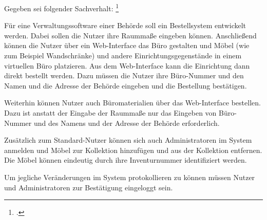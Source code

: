 \documentclass{lehramt-informatik}
\begin{document}
Gegeben sei folgender Sachverhalt:
\footcite[46116 – Herbst 2014 – Thema 2, TA 1, Aufgabe 3]{examen:46116:2014:09}

Für eine Verwaltungssoftware einer Behörde soll ein Bestellsystem
entwickelt werden. Dabei sollen die Nutzer ihre Raummaße eingeben
können. Anschließend können die Nutzer über ein Web-Interface das Büro
gestalten und Möbel (wie zum Beispiel Wandschränke) und andere
Einrichtungsgegenstände in einem virtuellen Büro platzieren. Aus dem
Web-Interface kann die Einrichtung dann direkt bestellt werden. Dazu
müssen die Nutzer ihre Büro-Nummer und den Namen und die Adresse der
Behörde eingeben und die Bestellung bestätigen.

Weiterhin können Nutzer auch Büromaterialien über das Web-Interface
bestellen. Dazu ist anstatt der Eingabe der Raummaße nur das Eingeben
von Büro-Nummer und des Namens und der Adresse der Behörde erforderlich.

Zusätzlich zum Standard-Nutzer können sich auch Administratoren im
System anmelden und Möbel zur Kollektion hinzufügen und aus der
Kollektion entfernen. Die Möbel können eindeutig durch ihre
Inventurnummer identifiziert werden.

Um jegliche Veränderungen im System protokollieren zu können müssen
Nutzer und Administratoren zur Bestätigung eingeloggt sein.
\end{document}
